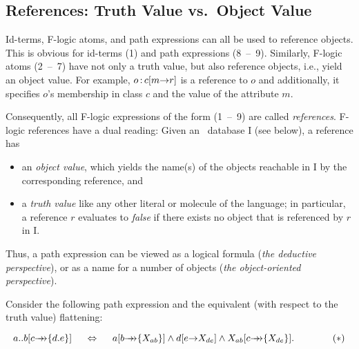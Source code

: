 \documentclass[11pt]{report}
\begin{document}
\subsection{References: Truth Value vs.\ Object Value}\label{sec-references}

Id-terms, F-logic atoms, and path expressions can all be used to
reference objects. This is obvious for id-terms (1) and path
expressions (8~--~9). Similarly, F-logic atoms (2~--~7) have not only a
truth value, but also reference objects, i.e., yield an object value.
For example, $o\,{\bf{:}}\, c[m{\rightarrow} r]$ is a reference to $o$ and additionally,
it specifies $o$'s membership in class $c$ and the value of the attribute $m$.

Consequently, all F-logic expressions of the form (1~--~9) are called
\emph{references}. F-logic references have a dual reading: Given an
\fl\ database \db I (see below), a reference has
\begin{itemize}
\item an \emph{object value}, which yields the name(s) of the objects
  reachable in \db I by the corresponding reference, and 
\item a \emph{truth value} like any other literal or molecule of the
  language; in particular, a reference $r$ evaluates to \emph{false} if
  there exists no object that is referenced by $r$ in \db I.
\end{itemize}
Thus, a path expression can be viewed as a logical formula
(\emph{the deductive perspective}), or as a name for a number of objects
(\emph{the object-oriented perspective}).

Consider the following path expression and the equivalent (with respect to
the truth value) flattening:

\begin{displaymath}
a..b[c\mvd\{d.e\}] \quad\ \Leftrightarrow \quad\  a[b\mvd\{X_{ab}\}]
\land d[e\fd X_{de}] \land X_{ab}[c\mvd\{X_{de}\}]. \hspace{4em} (*)
\end{displaymath}
\end{document}
